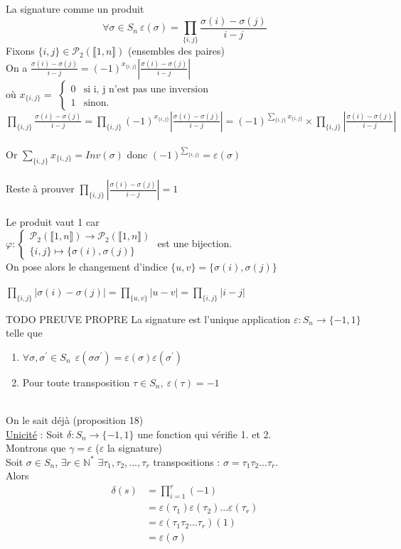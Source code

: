 \documentclass[11pt]{article}
\newcommand*{\N}{\mathbb{N}}
\newcommand*{\lb}{\llbracket}
\newcommand*{\rb}{\rrbracket}
\newcommand*{\n}{\\[0.2cm]}
\newcommand{\0}{\varnothing}
\renewcommand*{\phi}{\varphi}
\newcommand*{\e}{\varepsilon}
\newcommand*{\g}{\gamma}
\newcommand*{\s}{\sigma}
\begin{document}
\begin{prop}{La signature comme un produit}{}
    \begin{equation*}
        \forall  \s \in S_{n} ~ \e(\s) = \prod_{\{i, j\}} \frac{\s(i) - \s(j) }{i - j}
    \end{equation*}
    \tcblower
    Fixons $\{i, j \} \in \mathcal{P}_{2}(\lb 1, n \rb)$ (ensembles des paires)\n
    On a $\frac{\s(i) - \s(j) }{i - j} = (-1)^{x_{\{i, j \}}} |\frac{\s(i) - \s(j) }{i - j}|$\n
    où $x_{\{i, j \}} = $ 
    $\left\{ \begin{array}{ll}
        0 & \mbox{si {i, j} n'est pas une inversion} \\
        1 & \mbox{sinon.}
    \end{array} \right.$\n
    $\prod_{\{i, j\}} \frac{\s(i) - \s(j) }{i - j} = \prod_{\{i, j\}} (-1)^{x_{\{i, j \}}} |\frac{\s(i) - \s(j) }{i - j}| = (-1)^{\sum_{\{i, j \}} x_{\{i, j \}}} \times \prod_{\{i, j\}} |\frac{\s(i) - \s(j) }{i - j}|$\n\n
    Or $\sum_{\{i, j \}} x_{\{i, j \}} = Inv(\s)$ donc $(-1)^{\sum_{\{i, j \}}} = \e(\s)$\n\n
    Reste à prouver $\prod_{\{i, j\}} |\frac{\s(i) - \s(j) }{i - j}| = 1$\n\n
    Le produit vaut 1 car\n
    $\phi : \left\{ \begin{array}{ll}
        \mathcal{P}_{2}(\lb 1, n \rb) \to \mathcal{P}_{2}(\lb 1, n \rb) \\
        \{ i, j \} \mapsto \{ \s(i), \s(j) \}
    \end{array} \right.$ est une bijection. \n
    On pose alors le changement d'indice $\{ u, v \} = \{ \s(i), \s(j) \}$\n\n
    $\prod_{\{i, j\}} |\s(i) - \s(j)| = \prod_{\{u, v\}} |u - v| = \prod_{\{i, j\}} |i - j|$
\end{prop}

\begin{thm}{TODO PREUVE PROPRE}{}
    La signature est l'unique application $\e : S_{n} \to \{ -1, 1 \}$ telle que
    \begin{enumerate}
        \item $\forall \s, \s^{'} \in S_{n} ~~ \e(\s \s^{'}) = \e(\s) \e(\s^{'})$
        \item Pour toute transposition $\tau \in S_{n}, ~ \e(\tau) = -1$
    \end{enumerate}
    \tcblower
    \n
     On le sait déjà (proposition 18)\n
    \underline{Unicité} : Soit $\delta : S_{n} \to \{ -1, 1 \}$ une fonction qui vérifie 1. et 2.\n
    Montrons que $\g = \e$ ($\e$ la signature)\n
    Soit $\s \in S_{n}$, $\exists r \in \N^{*}$ $\exists \tau_{1}, \tau_{2}, ..., \tau_{r}$ transpositions : $\s = \tau_{1} \tau_{2} ... \tau_{r}$.\n
    Alors \begin{align*}
        \delta(s) &= \prod_{i=1}^{r}{(-1)} \n
    &= \e(\tau_{1})  \e(\tau_{2}) ... \e(\tau_{r})\n
    &= \e(\tau_{1} \tau_{2} ... \tau_{r}) (1)\n
    &= \e(\s)
    \end{align*}
\end{thm}
\end{document}
